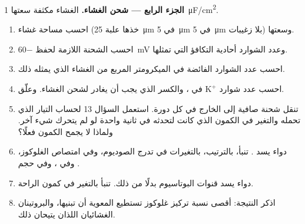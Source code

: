 \begin{problem}
\medskip
\noindent\textbf{الجزء الرابع --- شحن الغشاء.}
الغشاء مكثفة سعتها \qty{1}{\micro F/cm^2}.
\begin{enumerate}[resume]
  \item احسب مساحة غشاء  (خذها علبة \qty{25}{\micro m} في
        \qty{5}{\micro m} في \qty{5}{\micro m} بلا زغيبات) وسعتها.
  \item احسب الشحنة اللازمة لحفظ \qty{-60}{mV} وعدد الشوارد أحادية
        التكافؤ التي تمثلها.
  \item احسب عدد الشوارد الفائضة في الميكرومتر المربع من الغشاء الذي
        يمثله ذلك.
  \item احسب عدد شوارد $\mathrm{K^+}$ في ، والكسر الذي يجب أن
        يغادر لشحن الغشاء. وعلّق.
  \item تنقل  شحنة صافية إلى الخارج في كل دورة. استعمل السؤال
        13 لحساب التيار الذي تحمله والتغير في الكمون الذي كانت
        لتحدثه في ثانية واحدة لو لم يتحرك شيء آخر. ولماذا لا يجمح
        الكمون فعلًا؟
  \item دواء يسد . تنبأ، بالترتيب، بالتغيرات في تدرج الصوديوم،
        وفي امتصاص الغلوكوز، وفي ، وفي حجم .
  \item دواء يسد قنوات البوتاسيوم بدلًا من ذلك. تنبأ بالتغير في كمون
        الراحة.
  \item اذكر النتيجة: أقصى نسبة تركيز غلوكوز تستطيع  المعوية أن
        تبنيها، والبروتينان الغشائيان اللذان يتيحان ذلك.
\end{enumerate}
\end{problem}
